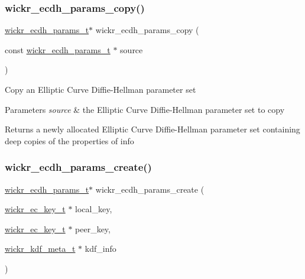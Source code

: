 \subsubsection{\texorpdfstring{wickr\+\_\+ecdh\+\_\+params\+\_\+copy()}{wickr\_ecdh\_params\_copy()}}
{\footnotesize\ttfamily \mbox{\hyperlink{structwickr__ecdh__params}{wickr\+\_\+ecdh\+\_\+params\+\_\+t}}$\ast$ wickr\+\_\+ecdh\+\_\+params\+\_\+copy (\begin{DoxyParamCaption}\item[{const \mbox{\hyperlink{structwickr__ecdh__params}{wickr\+\_\+ecdh\+\_\+params\+\_\+t}} $\ast$}]{source }\end{DoxyParamCaption})}

Copy an Elliptic Curve Diffie-\/\+Hellman parameter set


\begin{DoxyParams}{Parameters}
{\em source} & the Elliptic Curve Diffie-\/\+Hellman parameter set to copy \\
\hline
\end{DoxyParams}
\begin{DoxyReturn}{Returns}
a newly allocated Elliptic Curve Diffie-\/\+Hellman parameter set containing deep copies of the properties of \textquotesingle{}info\textquotesingle{} 
\end{DoxyReturn}
\mbox{\label{group__wickr__ecdh__params_ga8a5be72f13caa4bf5ee99e16cc3b092f}} 
\subsubsection{\texorpdfstring{wickr\+\_\+ecdh\+\_\+params\+\_\+create()}{wickr\_ecdh\_params\_create()}}
{\footnotesize\ttfamily \mbox{\hyperlink{structwickr__ecdh__params}{wickr\+\_\+ecdh\+\_\+params\+\_\+t}}$\ast$ wickr\+\_\+ecdh\+\_\+params\+\_\+create (\begin{DoxyParamCaption}\item[{\mbox{\hyperlink{structwickr__ec__key}{wickr\+\_\+ec\+\_\+key\+\_\+t}} $\ast$}]{local\+\_\+key,  }\item[{\mbox{\hyperlink{structwickr__ec__key}{wickr\+\_\+ec\+\_\+key\+\_\+t}} $\ast$}]{peer\+\_\+key,  }\item[{\mbox{\hyperlink{structwickr__kdf__meta}{wickr\+\_\+kdf\+\_\+meta\+\_\+t}} $\ast$}]{kdf\+\_\+info }\end{DoxyParamCaption})}

